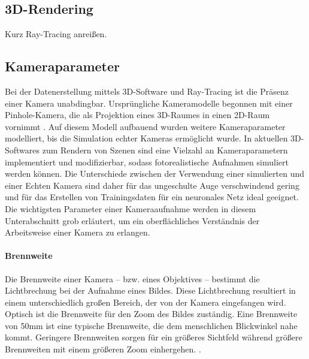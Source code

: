 

\subsection{3D-Rendering}
\label{sec:3d_rendering}

Kurz Ray-Tracing anreißen.

\todo{}


\subsection{Kameraparameter}
\label{sec:kameras}

Bei der Datenerstellung mittels 3D-Software und Ray-Tracing ist die Präsenz einer Kamera unabdingbar. Ursprüngliche Kameramodelle begonnen mit einer Pinhole-Kamera, die als Projektion eines 3D-Raumes in einen 2D-Raum vornimmt \cite{pinhole_camera}. Auf diesem Modell aufbauend wurden weitere Kameraparameter modelliert, bis die Simulation echter Kameras ermöglicht wurde. In aktuellen 3D-Softwares zum Rendern von Szenen sind eine Vielzahl an Kameraparametern implementiert und modifizierbar, sodass fotorealistische Aufnahmen simuliert werden können. Die Unterschiede zwischen der Verwendung einer simulierten und einer Echten Kamera sind daher für das ungeschulte Auge verschwindend gering und für das Erstellen von Trainingsdaten für ein neuronales Netz ideal geeignet. Die wichtigsten Parameter einer Kameraaufnahme werden in diesem Unterabschnitt grob erläutert, um ein oberflächliches Verständnis der Arbeitsweise einer Kamera zu erlangen.

\paragraph{Brennweite}

Die Brennweite einer Kamera -- bzw. eines Objektives -- bestimmt die Lichtbrechung bei der Aufnahme eines Bildes. Diese Lichtbrechung resultiert in einem unterschiedlich großen Bereich, der von der Kamera eingefangen wird. Optisch ist die Brennweite für den Zoom des Bildes zuständig. Eine Brennweite von 50mm ist eine typische Brennweite, die dem menschlichen Blickwinkel nahe kommt. Geringere Brennweiten sorgen für ein größeres Sichtfeld während größere Brennweiten mit einem größeren Zoom einhergehen. \cite{focal_lentgh}.

